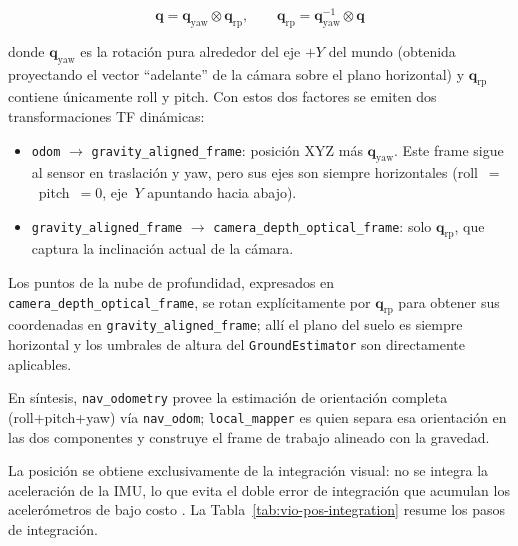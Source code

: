 \begin{itemize}
\begin{enumerate}
        \begin{equation}
          \mathbf{q} = \mathbf{q}_{\text{yaw}} \otimes \mathbf{q}_{\text{rp}},
          \qquad
          \mathbf{q}_{\text{rp}} = \mathbf{q}_{\text{yaw}}^{-1} \otimes \mathbf{q}
        \end{equation}

        donde $\mathbf{q}_{\text{yaw}}$ es la rotación pura alrededor del eje
        $+Y$ del mundo (obtenida proyectando el vector ``adelante'' de la cámara
        sobre el plano horizontal) y $\mathbf{q}_{\text{rp}}$ contiene
        únicamente roll y pitch. Con estos dos factores se emiten dos
        transformaciones TF dinámicas:
        \begin{itemize}
          \item \texttt{odom} $\to$ \texttt{gravity\_aligned\_frame}: posición
            XYZ más $\mathbf{q}_{\text{yaw}}$. Este frame sigue al sensor en
            traslación y yaw, pero sus ejes son siempre horizontales
            (roll~$=$~pitch~$= 0$, eje~$Y$ apuntando hacia abajo).
          \item \texttt{gravity\_aligned\_frame} $\to$
            \texttt{camera\_depth\_optical\_frame}: solo
            $\mathbf{q}_{\text{rp}}$, que captura la inclinación actual de la
            cámara.
        \end{itemize}
        Los puntos de la nube de profundidad, expresados en
        \texttt{camera\_depth\_optical\_frame}, se rotan explícitamente por
        $\mathbf{q}_{\text{rp}}$ para obtener sus coordenadas en
        \texttt{gravity\_aligned\_frame}; allí el plano del suelo es siempre
        horizontal y los umbrales de altura del \texttt{GroundEstimator}
        son directamente aplicables.

        En síntesis, \texttt{nav\_odometry} provee la estimación de
        orientación completa (roll+pitch+yaw) vía \texttt{nav\_odom};
        \texttt{local\_mapper} es quien separa esa orientación en las dos
        componentes y construye el frame de trabajo alineado con la gravedad.

        La posición se obtiene exclusivamente de la integración visual: no se
        integra la aceleración de la IMU, lo que evita el doble error de
        integración que acumulan los acelerómetros de bajo costo
        \cite{Woodman2007}.
        La Tabla~\ref{tab:vio-pos-integration} resume los pasos de integración.


\end{enumerate}
\end{itemize}
